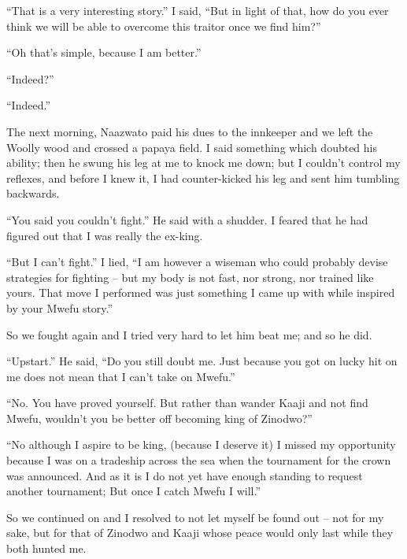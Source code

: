 ``That is a very interesting story.'' I said, ``But in light of that, how do you ever think we will be able to overcome this traitor once we find him?''

``Oh that's simple, because I am better.''

``Indeed?''

``Indeed.''

\tbreak

The next morning, Naazwato paid his dues to the innkeeper and we left the Woolly wood and crossed a papaya field. I said something which doubted his ability; then he swung his leg at me to knock me down; but I couldn't control my reflexes, and before I knew it, I had counter-kicked his leg and sent him tumbling backwards.

``You said you couldn't fight.'' He said with a shudder. I feared that he had figured out that I was really the ex-king.

``But I can't fight.'' I lied, ``I am however a wiseman who could probably devise strategies for fighting -- but my body is not fast, nor strong, nor trained like yours. That move I performed was just something I came up with while inspired by your Mwefu story.''

So we fought again and I tried very hard to let him beat me; and so he did.

``Upstart.'' He said, ``Do you still doubt me. Just because you got on lucky hit on me does not mean that I can't take on Mwefu.''

``No. You have proved yourself. But rather than wander Kaaji and not find Mwefu, wouldn't you be better off becoming king of Zinodwo?''

``No although I aspire to be king, (because I deserve it) I missed my opportunity because I was on a tradeship across the sea when the tournament for the crown was announced. And as it is I do not yet have enough standing to request another tournament; But once I catch Mwefu I will.''

So we continued on and I resolved to not let myself be found out -- not for my sake, but for that of Zinodwo and Kaaji whose peace would only last while they both hunted me.
